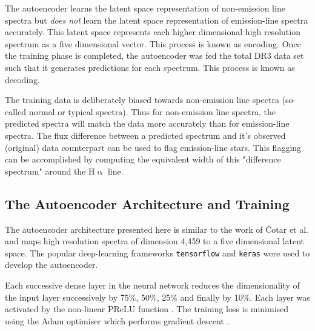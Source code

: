 The autoencoder learns the latent space representation of non-emission line spectra but \emph{does not} learn the latent space representation of emission-line spectra accurately. This latent space represents each higher dimensional high resolution spectrum as a five dimensional vector. This process is known as encoding. Once the training phase is completed, the autoencoder was fed the total DR3 data set such that it generates predictions for each spectrum. This process is known as decoding. 

The training data is deliberately biased towards non-emission line spectra (so-called normal or typical spectra). Thus for non-emission line spectra, the predicted spectra will match the data more accurately than for emission-line spectra. The flux difference between a predicted spectrum and it's observed (original) data counterpart can be used to flag emission-line stars. This flagging can be accomplished by computing the equivalent width of this "difference spectrum" around the H$\upalpha$ line.

\subsection{The Autoencoder Architecture and Training}

The autoencoder architecture presented here is similar to the work of Čotar et al. and maps high resolution spectra of dimension 4,459 to a five dimensional latent space. The popular deep-learning frameworks \texttt{tensorflow}\cite{tensorflow2015-whitepaper} and \texttt{keras}\cite{chollet2015keras} were used to develop the autoencoder.

Each successive dense layer in the neural network reduces the dimensionality of the input layer successively by 75\%, 50\%, 25\% and finally by 10\%. Each layer was activated by the non-linear PReLU function \cite{he2015delving}. The training loss is minimised using the Adam optimiser which performs gradient descent \cite{kingma2014adam}.

